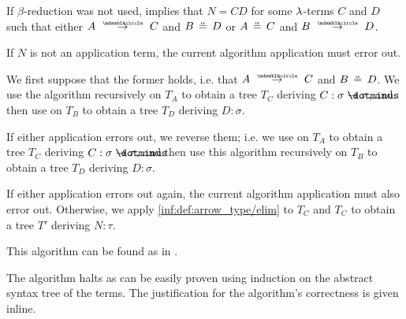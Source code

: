 \begin{algorithm}
\begin{thmenum}
\begin{thmenum}
       If \( \beta \)-reduction was not used,  implies that \( N = CD \) for some \( {\mathrm \lambda} \)-terms \( C \) and \( D \) such that either \( A \pred C \) and \( B \aequiv D \) or \( A \aequiv C \) and \( B \pred D \).

      If \( N \) is not an application term, the current algorithm application must error out.

      We first suppose that the former holds, i.e. that \( A \pred C \) and \( B \aequiv D \). We use the algorithm recursively on \( T_A \) to obtain a tree \( T_C \) deriving \( C: \sigma \synimplies \tau \), and then use  on \( T_B \) to obtain a tree \( T_D \) deriving \( D: \sigma \).

      If either application errors out, we reverse them; i.e. we use  on \( T_A \) to obtain a tree \( T_C \) deriving \( C: \sigma \synimplies \tau \), and then use this algorithm recursively on \( T_B \) to obtain a tree \( T_D \) deriving \( D: \sigma \).

      If either application errors out again, the current algorithm application must also error out. Otherwise, we apply \ref{inf:def:arrow_type/elim} to \( T_C \) and \( T_C \) to obtain a tree \( T' \) deriving \( N: \tau \).
    \end{thmenum}
  \end{thmenum}
\end{algorithm}
\begin{comments}
  \item This algorithm can be found as  in \cite{notebook:code}.
\end{comments}
\begin{defproof}
  The algorithm halts as can be easily proven using induction on the abstract syntax tree of the terms. The justification for the algorithm's correctness is given inline.
\end{defproof}

